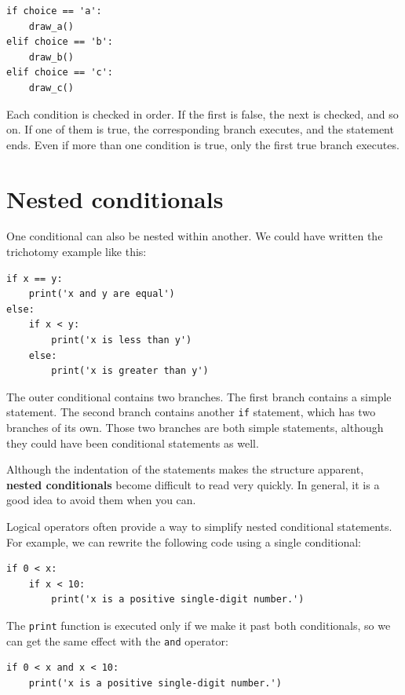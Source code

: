 \documentclass[10pt]{book}
\begin{document}


\beforeverb
\begin{verbatim}
if choice == 'a':
    draw_a()
elif choice == 'b':
    draw_b()
elif choice == 'c':
    draw_c()
\end{verbatim}
\afterverb
%
Each condition is checked in order.  If the first is false,
the next is checked, and so on.  If one of them is
true, the corresponding branch executes, and the statement
ends.  Even if more than one condition is true, only the
first true branch executes.  


\section{Nested conditionals}

One conditional can also be nested within another.  We could have
written the trichotomy example like this:

\beforeverb
\begin{verbatim}
if x == y:
    print('x and y are equal')
else:
    if x < y:
        print('x is less than y')
    else:
        print('x is greater than y')
\end{verbatim}
\afterverb
%
The outer conditional contains two branches.  The
first branch contains a simple statement.  The second branch
contains another {\tt if} statement, which has two branches of its
own.  Those two branches are both simple statements,
although they could have been conditional statements as well.

Although the indentation of the statements makes the structure
apparent, {\bf nested conditionals} become difficult to read very
quickly. In general, it is a good idea to avoid them when you can.

Logical operators often provide a way to simplify nested conditional
statements.  For example, we can rewrite the following code using a
single conditional:

\beforeverb
\begin{verbatim}
if 0 < x:
    if x < 10:
        print('x is a positive single-digit number.')
\end{verbatim}
\afterverb
%
The {\tt print} function is executed only if we make it past both
conditionals, so we can get the same effect with the {\tt and} operator:

\beforeverb
\begin{verbatim}
if 0 < x and x < 10:
    print('x is a positive single-digit number.')
\end{verbatim}
\afterverb
\end{document}
